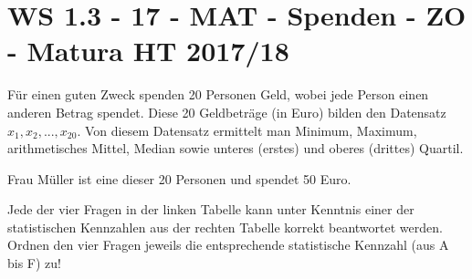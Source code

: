 \section{WS 1.3 - 17 - MAT - Spenden - ZO - Matura HT 2017/18}

\begin{beispiel}[WS 1.3]{1} %
Für einen guten Zweck spenden 20 Personen Geld, wobei jede Person einen anderen Betrag spendet. Diese 20 Geldbeträge (in Euro) bilden den Datensatz $x_1, x_2,...,x_{20}$. Von diesem Datensatz ermittelt man Minimum, Maximum, arithmetisches Mittel, Median sowie unteres (erstes) und oberes (drittes) Quartil.

Frau Müller ist eine dieser 20 Personen und spendet 50 Euro.

Jede der vier Fragen in der linken Tabelle kann unter Kenntnis einer der statistischen Kennzahlen aus der rechten Tabelle korrekt beantwortet werden.
Ordnen den vier Fragen jeweils die entsprechende statistische Kennzahl (aus A bis F) zu!

\end{beispiel}